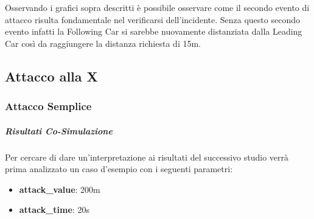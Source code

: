 Osservando i grafici sopra descritti è possibile osservare come il secondo evento di attacco risulta fondamentale nel verificarsi dell'incidente. Senza questo secondo evento infatti la Following Car si sarebbe nuovamente distanziata dalla Leading Car così da raggiungere la distanza richiesta di 15m.

\subsection{Attacco alla X}
\subsubsection{Attacco Semplice}
\subparagraph{Risultati Co-Simulazione}
Per cercare di dare un'interpretazione ai risultati del successivo studio verrà prima analizzato un caso d'esempio con i seguenti parametri:
\begin{itemize}
	\item \textbf{attack\_value}: 200m
	\item \textbf{attack\_time}: 20s
\end{itemize}


